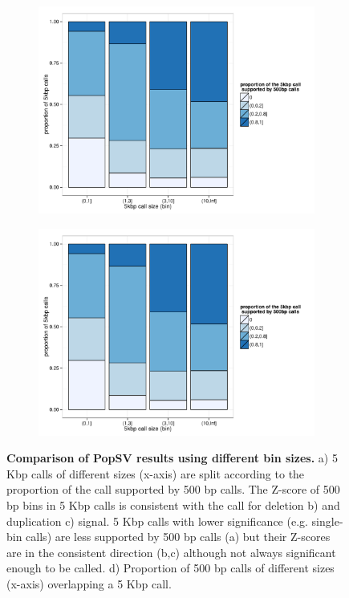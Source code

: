 \begin{figure}[htp]
  \begin{subfigure}{.48\textwidth}
    \includegraphics[width=\linewidth, page=3]{figures/twin-binSizeComp.pdf}
    \caption{}
    \label{fig:size:zdup}
  \end{subfigure}
  \begin{subfigure}{.48\textwidth}
    \includegraphics[width=\linewidth,page=6]{figures/twin-binSizeComp.pdf}
    \caption{}
    \label{fig:size:sens}
  \end{subfigure}
  \caption[Comparison of {\sf PopSV} results using different bin sizes.]{{\bf Comparison of {\sf PopSV} results using different bin sizes.} {\small a) 5 Kbp calls of different sizes (x-axis) are split according to the proportion of the call supported by 500 bp calls. The Z-score of 500 bp bins in 5 Kbp calls is consistent with the call for deletion b) and duplication c) signal. 5 Kbp calls with lower significance (e.g. single-bin calls) are less supported by 500 bp calls (a) but their Z-scores are in the consistent direction (b,c) although not always significant enough to be called. d) Proportion of 500 bp calls of different sizes (x-axis) overlapping a 5 Kbp call.}}
  \label{fig:compsize}
\end{figure}

